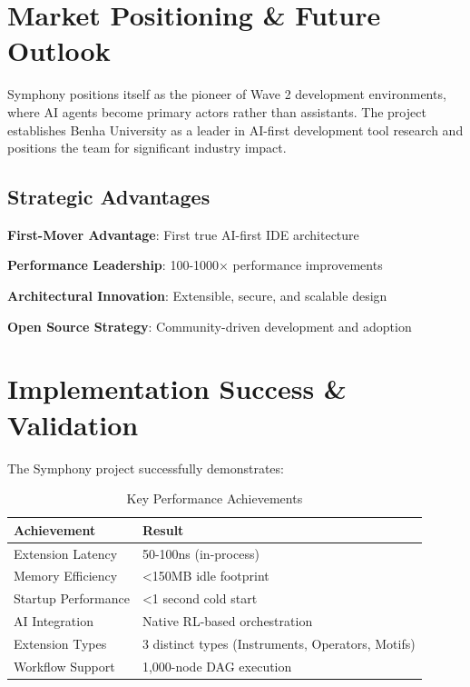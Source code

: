 \section*{Market Positioning \& Future Outlook}

Symphony positions itself as the pioneer of Wave 2 development environments, where AI agents become primary actors rather than assistants. The project establishes Benha University as a leader in AI-first development tool research and positions the team for significant industry impact.

\subsection*{Strategic Advantages}
\begin{compactlist}
    \item \textbf{First-Mover Advantage}: First true AI-first IDE architecture
    \item \textbf{Performance Leadership}: 100-1000× performance improvements
    \item \textbf{Architectural Innovation}: Extensible, secure, and scalable design
    \item \textbf{Open Source Strategy}: Community-driven development and adoption
\end{compactlist}

\section*{Implementation Success \& Validation}

The Symphony project successfully demonstrates:

\begin{table}[ht]
\centering
\begin{tabular}{@{}ll@{}}
\toprule
\textbf{Achievement} & \textbf{Result} \\
\midrule
Extension Latency & 50-100ns (in-process) \\
Memory Efficiency & <150MB idle footprint \\
Startup Performance & <1 second cold start \\
AI Integration & Native RL-based orchestration \\
Extension Types & 3 distinct types (Instruments, Operators, Motifs) \\
Workflow Support & 1,000-node DAG execution \\
\bottomrule
\end{tabular}
\caption{Key Performance Achievements}
\end{table}

